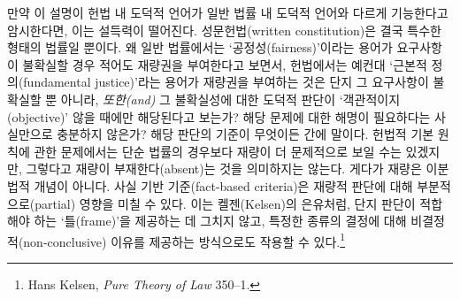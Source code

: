 \documentclass[12pt, oneside]{book}  %
\begin{document}
만약 이 설명이 헌법 내 도덕적 언어가 일반 법률 내 도덕적 언어와 다르게
기능한다고 암시한다면, 이는 설득력이 떨어진다. 성문헌법(written
constitution)은 결국 특수한 형태의 법률일 뿐이다. 왜 일반 법률에서는
`공정성(fairness)'이라는 용어가 요구사항이 불확실할 경우 적어도 재량권을
부여한다고 보면서, 헌법에서는 예컨대 `근본적 정의(fundamental
justice)'라는 용어가 재량권을 부여하는 것은 단지 그 요구사항이 불확실할
뿐 아니라, \emph{또한(and)} 그 불확실성에 대한 도덕적 판단이
`객관적이지(objective)' 않을 때에만 해당된다고 보는가? 해당 문제에 대한
해명이 필요하다는 사실만으로 충분하지 않은가? 해당 판단의 기준이
무엇이든 간에 말이다. 헌법적 기본 원칙에 관한 문제에서는 단순 법률의
경우보다 재량이 더 문제적으로 보일 수는 있겠지만, 그렇다고 재량이
부재한다(absent)는 것을 의미하지는 않는다. 게다가 재량은 이분법적 개념이
아니다. 사실 기반 기준(fact-based criteria)은 재량적 판단에 대해
부분적으로(partial) 영향을 미칠 수 있다. 이는 켈젠(Kelsen)의 은유처럼,
단지 판단이 적합해야 하는 `틀(frame)'을 제공하는 데 그치지 않고, 특정한
종류의 결정에 대해 비결정적(non-conclusive) 이유를 제공하는 방식으로도
작용할 수 있다.\footnote{Hans Kelsen, \emph{Pure Theory of Law} 350--1.}
\end{document}
